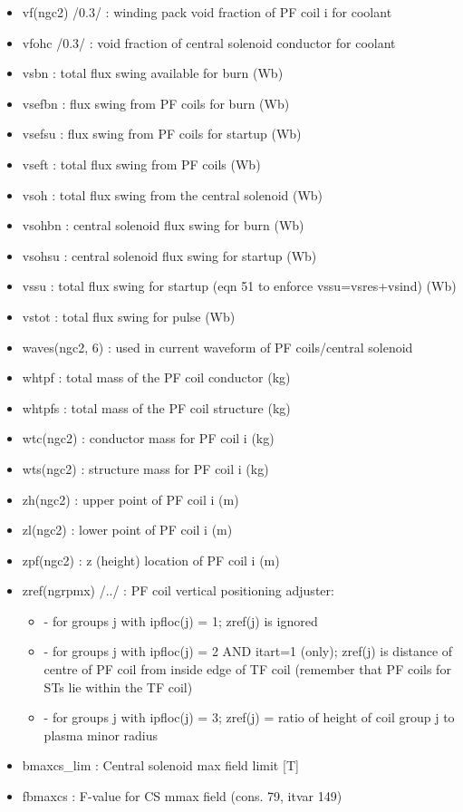 \documentclass[]{article}
\providecommand{\tightlist}{%
  \setlength{\itemsep}{0pt}\setlength{\parskip}{0pt}}
\begin{document}
\begin{itemize}
\item
  vf(ngc2) /0.3/ : winding pack void fraction of PF coil i for coolant
\item
  vfohc /0.3/ : void fraction of central solenoid conductor for coolant
\item
  vsbn : total flux swing available for burn (Wb)
\item
  vsefbn : flux swing from PF coils for burn (Wb)
\item
  vsefsu : flux swing from PF coils for startup (Wb)
\item
  vseft : total flux swing from PF coils (Wb)
\item
  vsoh : total flux swing from the central solenoid (Wb)
\item
  vsohbn : central solenoid flux swing for burn (Wb)
\item
  vsohsu : central solenoid flux swing for startup (Wb)
\item
  vssu : total flux swing for startup (eqn 51 to enforce
  vssu=vsres+vsind) (Wb)
\item
  vstot : total flux swing for pulse (Wb)
\item
  waves(ngc2, 6) : used in current waveform of PF coils/central solenoid
\item
  whtpf : total mass of the PF coil conductor (kg)
\item
  whtpfs : total mass of the PF coil structure (kg)
\item
  wtc(ngc2) : conductor mass for PF coil i (kg)
\item
  wts(ngc2) : structure mass for PF coil i (kg)
\item
  zh(ngc2) : upper point of PF coil i (m)
\item
  zl(ngc2) : lower point of PF coil i (m)
\item
  zpf(ngc2) : z (height) location of PF coil i (m)
\item
  zref(ngrpmx) /../ : PF coil vertical positioning adjuster:

  \begin{itemize}
  \tightlist
  \item
    - for groups j with ipfloc(j) = 1; zref(j) is ignored
  \item
    - for groups j with ipfloc(j) = 2 AND itart=1 (only); zref(j) is
    distance of centre of PF coil from inside edge of TF coil (remember
    that PF coils for STs lie within the TF coil)
  \item
    - for groups j with ipfloc(j) = 3; zref(j) = ratio of height of coil
    group j to plasma minor radius
  \end{itemize}
\item
  bmaxcs\_lim : Central solenoid max field limit {[}T{]}
\item
  fbmaxcs : F-value for CS mmax field (cons. 79, itvar 149)
\end{itemize}
\end{document}
